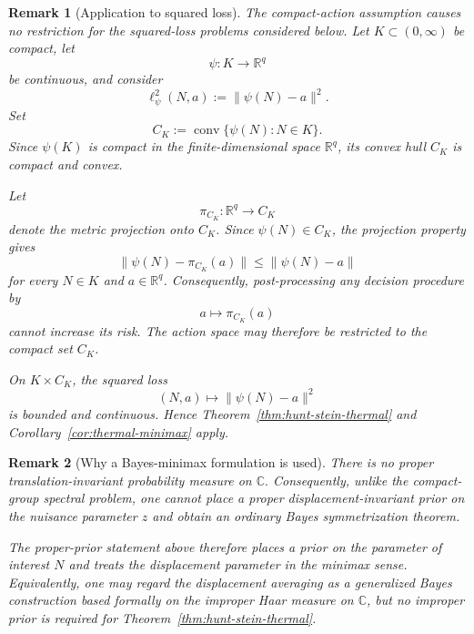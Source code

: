 \documentclass{article}
\newtheorem{remark}{Remark}
\theoremstyle{named}
\theoremstyle{named1}
\newcommand{\bbC}{\mathbb C}
\newcommand{\bbR}{\mathbb R}
\theoremstyle{plain}
\theoremstyle{remark}
\begin{document}
\begin{remark}[Application to squared loss]
\label{rem:thermal-squared-loss-compactification}
The compact-action assumption causes no restriction for the squared-loss
problems considered below. Let \(K\subset(0,\infty)\) be compact, let
\[
    \psi:K\rightarrow\bbR^q
\]
be continuous, and consider
\[
    \ell^2_\psi(N,a)
    :=
    \|\psi(N)-a\|^2.
\]
Set
\[
    C_K
    :=
    \operatorname{conv}
    \{\psi(N):N\in K\}.
\]
Since \(\psi(K)\) is compact in the finite-dimensional space \(\bbR^q\),
its convex hull \(C_K\) is compact and convex.

Let
\[
    \pi_{C_K}:\bbR^q\rightarrow C_K
\]
denote the metric projection onto \(C_K\). Since \(\psi(N)\in C_K\), the
projection property gives
\begin{equation}
    \|\psi(N)-\pi_{C_K}(a)\|
    \leq
    \|\psi(N)-a\|
    \label{eq:projection-risk-improvement}
\end{equation}
for every \(N\in K\) and \(a\in\bbR^q\). Consequently, post-processing any
decision procedure by
\[
    a\longmapsto\pi_{C_K}(a)
\]
cannot increase its risk. The action space may therefore be restricted to
the compact set \(C_K\).

On \(K\times C_K\), the squared loss
\[
    (N,a)\longmapsto\|\psi(N)-a\|^2
\]
is bounded and continuous. Hence Theorem~\ref{thm:hunt-stein-thermal} and
Corollary~\ref{cor:thermal-minimax} apply.
\end{remark}

\begin{remark}[Why a Bayes-minimax formulation is used]
There is no proper translation-invariant probability measure on
$\bbC.$
Consequently, unlike the compact-group spectral problem, one cannot place a
proper displacement-invariant prior on the nuisance parameter \(z\) and
obtain an ordinary Bayes symmetrization theorem.

The proper-prior statement above therefore places a prior on the parameter
of interest \(N\) and treats the displacement parameter in the minimax
sense. Equivalently, one may regard the displacement averaging as a
generalized Bayes construction based formally on the improper Haar measure
on \(\bbC\), but no improper prior is required for
Theorem~\ref{thm:hunt-stein-thermal}.

\end{remark}
\end{document}
